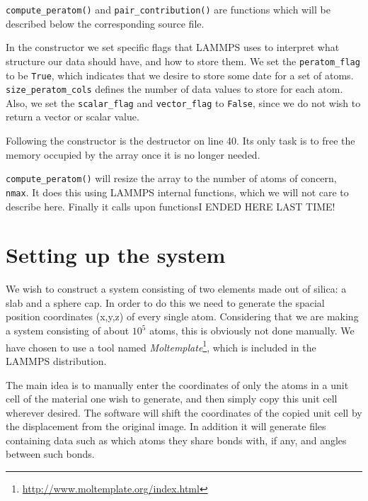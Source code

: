 \documentclass[twoside,english]{uiofysmaster}
\begin{document}
\texttt{compute\_peratom()} and \texttt{pair\_contribution()} are functions which will be described below the corresponding source file. 





In the constructor we set specific flags that LAMMPS uses to interpret what structure our data should have, and how to store them. We set the \texttt{peratom\_flag} to be \texttt{True}, which indicates that we desire to store some date for a set of atoms. \texttt{size\_peratom\_cols} defines the number of data values to store for each atom. Also, we set the \texttt{scalar\_flag} and \texttt{vector\_flag} to \texttt{False}, since we do not wish to return a vector or scalar value.

Following the constructor is the destructor on line 40. Its only task is to free the memory occupied by the array once it is no longer needed.  

\texttt{compute\_peratom()} will resize the array to the number of atoms of concern, \texttt{nmax}. It does this using LAMMPS internal functions, which we will not care to describe here. Finally it calls upon functions{\huge  I ENDED HERE LAST TIME!}






\chapter{Setting up the system}

We wish to construct a system consisting of {\color{red} two} elements made out of silica: a slab and a sphere cap. In order to do this we need to generate the spacial position coordinates (x,y,z) of every single atom. Considering that we are making a system consisting of about $10^5$ atoms, this is obviously not done manually. We have chosen to use a tool named \textit{Moltemplate}\footnote{\href{http://www.moltemplate.org/index.html}{http://www.moltemplate.org/index.html}}, which is included in the LAMMPS distribution.

The main idea is to manually enter the coordinates of only the atoms in a unit cell of the material one wish to generate, and then simply copy this unit cell wherever desired. The software will shift the coordinates of the copied unit cell by the displacement from the original image. In addition it will generate files containing data such as which atoms they share bonds with, if any, and angles between such bonds. 
\end{document}
